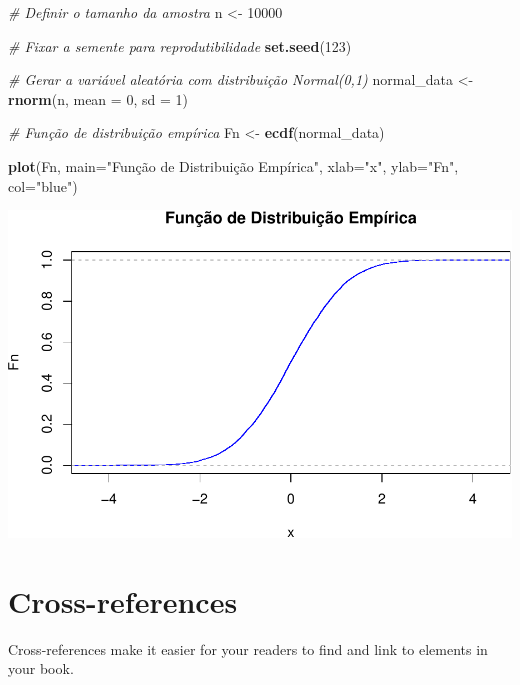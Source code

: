 \documentclass[
]{book}
\newenvironment{Shaded}{\begin{snugshade}}{\end{snugshade}}
\newcommand{\AttributeTok}[1]{\textcolor[rgb]{0.13,0.29,0.53}{#1}}
\newcommand{\CommentTok}[1]{\textcolor[rgb]{0.56,0.35,0.01}{\textit{#1}}}
\newcommand{\DecValTok}[1]{\textcolor[rgb]{0.00,0.00,0.81}{#1}}
\newcommand{\FunctionTok}[1]{\textcolor[rgb]{0.13,0.29,0.53}{\textbf{#1}}}
\newcommand{\NormalTok}[1]{#1}
\newcommand{\OtherTok}[1]{\textcolor[rgb]{0.56,0.35,0.01}{#1}}
\newcommand{\StringTok}[1]{\textcolor[rgb]{0.31,0.60,0.02}{#1}}
\theoremstyle{definition}
\theoremstyle{definition}
\theoremstyle{definition}
\theoremstyle{definition}
\theoremstyle{remark}
\begin{document}
\begin{Shaded}
\begin{Highlighting}[]
\CommentTok{\# Definir o tamanho da amostra}
\NormalTok{n }\OtherTok{\textless{}{-}} \DecValTok{10000}

\CommentTok{\# Fixar a semente para reprodutibilidade}
\FunctionTok{set.seed}\NormalTok{(}\DecValTok{123}\NormalTok{)}

\CommentTok{\# Gerar a variável aleatória com distribuição Normal(0,1)}
\NormalTok{normal\_data }\OtherTok{\textless{}{-}} \FunctionTok{rnorm}\NormalTok{(n, }\AttributeTok{mean =} \DecValTok{0}\NormalTok{, }\AttributeTok{sd =} \DecValTok{1}\NormalTok{)}

\CommentTok{\# Função de distribuição empírica}
\NormalTok{Fn }\OtherTok{\textless{}{-}} \FunctionTok{ecdf}\NormalTok{(normal\_data)}

\FunctionTok{plot}\NormalTok{(Fn, }\AttributeTok{main=}\StringTok{"Função de Distribuição Empírica"}\NormalTok{,}
     \AttributeTok{xlab=}\StringTok{"x"}\NormalTok{,}
     \AttributeTok{ylab=}\StringTok{"Fn"}\NormalTok{,}
     \AttributeTok{col=}\StringTok{"blue"}\NormalTok{)}
\end{Highlighting}
\end{Shaded}

\includegraphics{meuLivro2_files/figure-latex/unnamed-chunk-132-1.pdf}

\chapter{Cross-references}\label{cross}

Cross-references make it easier for your readers to find and link to elements in your book.
\end{document}
